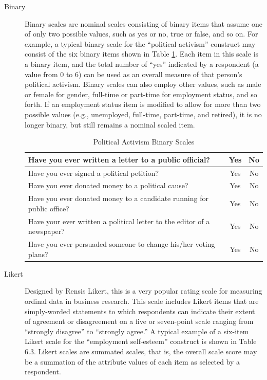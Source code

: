 \begin{description}
	\item[Binary] Binary scales are nominal scales consisting of binary items that assume one of only two possible values, such as yes or no, true or false, and so on. For example, a typical binary scale for the ``political activism'' construct may consist of the six binary items shown in Table \ref{ch05:table01}. Each item in this scale is a binary item, and the total number of ``yes'' indicated by a respondent (a value from $ 0 $ to $ 6 $) can be used as an overall measure of that person's political activism. Binary scales can also employ other values, such as male or female for gender, full-time or part-time for employment status, and so forth. If an employment status item is modified to allow for more than two possible values (e.g., unemployed, full-time, part-time, and retired), it is no longer binary, but still remains a nominal scaled item.
	
	\begin{table}[H]
		\begin{tabularx}{\linewidth}{Xcc}	
			\hline 
			Have you ever written a letter to a public official? & Yes & No \\ 
			\hline 
			Have you ever signed a political petition? & Yes & No \\ 
			\hline 
			Have you ever donated money to a political cause? & Yes & No   \\ 
			\hline 
			Have you ever donated money to a candidate running for public office? & Yes & No   \\ 
			\hline 
			Have your ever written a political letter to the editor of a newspaper?& Yes & No   \\ 
			\hline 
			Have you ever persuaded someone to change his/her voting plans? & Yes & No   \\ 
			\hline 
		\end{tabularx}
		\caption{Political Activism Binary Scales}
		\label{ch05:table01}
	\end{table}
	
	\item[Likert] Designed by Rensis Likert, this is a very popular rating scale for measuring ordinal data in business research. This scale includes Likert items that are simply-worded statements to which respondents can indicate their extent of agreement or disagreement on a five or seven-point scale ranging from ``strongly disagree'' to ``strongly agree.'' A typical example of a six-item Likert scale for the ``employment self-esteem'' construct is shown in Table 6.3. Likert scales are summated scales, that is, the overall scale score may be a summation of the attribute values of each item as selected by a respondent.
	

\end{description}

